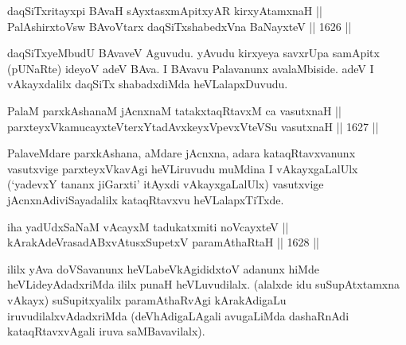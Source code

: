 \begin{shl}
\footnotemark[4]daqSiTxritayxpi BAvaH sAyxtasxmApitxyAR kirxyAtamxnaH || \\
PalAshirxtoV\s sw BAvoV\s tarx daqSiTxshabedxVna BaNayxteV \hfill || 1626 ||  
\end{shl}

\begin{artha}
daqSiTxyeMbudU BAvaveV Aguvudu. yAvudu kirxyeya savxrUpa samApitx (pUNaRte) ideyoV adeV BAva. I BAvavu Palavanunx avalaMbiside. adeV I vAkayxdalilx daqSiTx shabadxdiMda heVLalapxDuvudu.
\end{artha}


\begin{shl}
PalaM parxkAshanaM jAcnxnaM tatakxtaqRtavxM ca vasutxnaH || \\
parxteyxVkamucayxteV\s terxYtadAvxkeyxVpevxVteVSu vasutxnaH \hfill || 1627 ||  
\end{shl}

\begin{artha}
PalaveMdare parxkAshana, aMdare jAcnxna, adara kataqRtavxvanunx vasutxvige parxteyxVkavAgi heVLiruvudu muMdina I vAkayxgaLalUlx (`yadevxY tananx jiGarxti' itAyxdi vAkayxgaLalUlx) vasutxvige jAcnxnAdiviSayadalilx kataqRtavxvu heVLalapxTiTxde.
\end{artha}



\begin{shl}
iha yadUdxSaNaM vAcayxM tadukatxmiti noVcayxteV || \\
kArakAdeVrasadABxvAtusxSupetxV paramAthaRtaH \hfill || 1628 ||  
\end{shl}

\begin{artha}
ililx yAva doVSavanunx heVLabeVkAgididxtoV adanunx hiMde heVLideyAdadxriMda ililx punaH heVLuvudilalx. (alalxde idu suSupAtxtamxna vAkayx) suSupitxyalilx paramAthaRvAgi kArakAdigaLu iruvudilalxvAdadxriMda (deVhAdigaLAgali avugaLiMda dashaRnAdi kataqRtavxvAgali iruva saMBavavilalx).
\end{artha}

